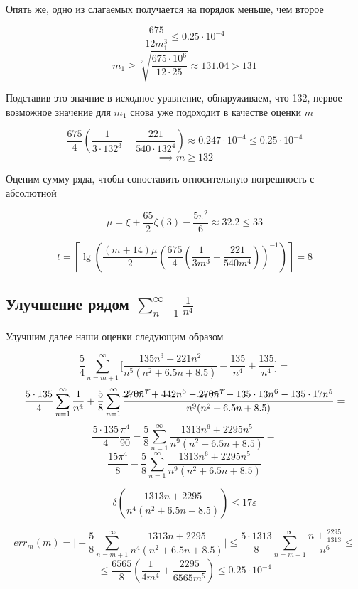 \documentclass[11pt,a4paper,oneside]{article}
\begin{document}
Опять же, одно из слагаемых получается на порядок меньше, чем второе

$$ \frac{675}{12 m_1^3} \le 0.25 \cdot 10^{-4}  $$
$$ m_1 \ge \sqrt[3]{\frac{675 \cdot 10^6}{12 \cdot 25}} \approx 131.04 > 131 $$

Подставив это значние в исходное уравнение, обнаруживаем, что 132, первое возможное значение для $m_1$ снова уже подоходит в качестве оценки $m$

$$ \frac{675}{4} \left( \frac{1}{3 \cdot 132^3} + \frac{221}{540 \cdot 132^4} \right)
	\approx 0.247 \cdot 10^{-4} \le 0.25 \cdot 10^{-4} $$
$$ \implies m \ge 132 $$

Оценим сумму ряда, чтобы сопоставить относительную погрешность с абсолютной

$$ \mu = \xi + \frac{65}{2} \zeta(3) - \frac{5 \pi^2}{6} \approx 32.2 \le 33 $$

$$ t = \left\lceil \lg\left(
	\frac{(m + 14) \mu}{2} \left(
		\frac{675}{4} \left( \frac{1}{3 m^3} + \frac{221}{540 m^4} \right)
	\right)^{-1} \right) \right\rceil = 8 $$
		
\subsection{Улучшение рядом $ \sum_{n = 1}^{\infty} \frac{1}{n^4} $}
		
Улучшим далее наши оценки следующим образом

$$ \frac{5}{4} \sum_{n = m + 1}^{\infty}
	\biggr[ \frac{135 n^3 + 221 n^2}{n^5 (n^2 + 6.5n + 8.5)} - 
	\frac{135}{n^4} + \frac{135}{n^4} \biggr] =$$
$$ \frac{5 \cdot 135}{4} \sum_{n = 1}^{\infty} \frac{1}{n^4} +
	\frac{5}{8} \sum_{n = 1}^{\infty}
	\frac{\cancel{270 n^7} + 442 n^6 - \cancel{270 n^7} -
		135 \cdot 13 n^6 - 135 \cdot 17 n^5}{n^9 (n^2 + 6.5n + 8.5)} = $$
$$ \frac{5 \cdot 135}{4} \frac{\pi^4}{90} -
	\frac{5}{8} \sum_{n = 1}^{\infty}
	\frac{1313 n^6 + 2295 n^5}{n^9 (n^2 + 6.5n + 8.5)} = $$
$$ \frac{15 \pi^4}{8} -
	\frac{5}{8} \sum_{n = 1}^{\infty}
	\frac{1313 n^6 + 2295 n^5}{n^9 (n^2 + 6.5n + 8.5)} $$

$$ \delta\left( \frac{1313 n + 2295}{n^4 (n^2 + 6.5n + 8.5)} \right) \le 17 \varepsilon $$

$$ err_{m}(m) =
	\biggr| - \frac{5}{8} \sum_{n = m + 1}^{\infty}
		\frac{1313 n + 2295}{n^4 (n^2 + 6.5n + 8.5)} \biggr|
	\le \frac{5 \cdot 1313}{8} \sum_{n = m + 1}^{\infty} \frac{n + \frac{2295}{1313}}{n^6} \le $$
$$ \le \frac{6565}{8} \left( \frac{1}{4 m^4} + \frac{2295}{6565 m^5} \right)
	\le 0.25 \cdot 10^{-4} $$
	
\end{document}
